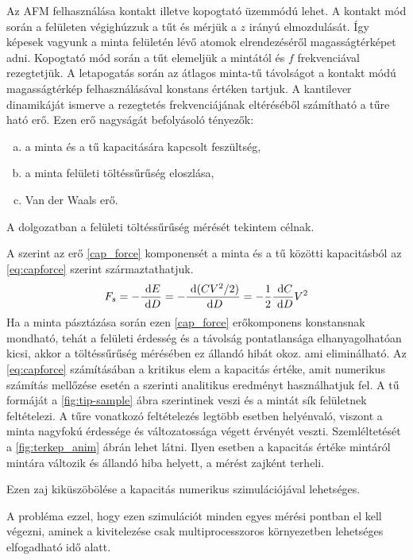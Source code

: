 	Az AFM felhasználása kontakt illetve kopogtató üzemmódú lehet. A kontakt mód során a
	felületen végighúzzuk a tűt és mérjük a $z$ irányú elmozdulását. Így képesek vagyunk a minta
	felületén lévő atomok elrendezéséről magasságtérképet adni.
	Kopogtató mód \cite{Martin1987} során a tűt elemeljük a mintától és $f$ frekvenciával rezegtetjük.
	A letapogatás során az  átlagos minta-tű távolságot a kontakt módú magasságtérkép felhasználásával
	konstans értéken tartjuk.
	A kantilever dinamikáját ismerve a rezegtetés frekvenciájának eltéréséből
	számítható a tűre ható erő. Ezen erő nagyságát befolyásoló tényezők:
	\begin{enumerate}[a)]
		\item a minta és a tű kapacitására kapcsolt feszültség,\label{cap_force}
		\item a minta felületi töltéssűrűség eloszlása,\label{sc_force}
		\item Van der Waals erő.\label{vdw_force}
	\end{enumerate}
	A dolgozatban a felületi töltéssűrűség mérését tekintem célnak.
	
	A \cite{Butt1991Dec, Butt20051} szerint az erő \ref{cap_force} komponensét a minta és a tű közötti
	kapacitásból az \eqref{eq:capforce} szerint származtathatjuk.
	\begin{equation}\label{eq:capforce} 
	F_{s} = -\frac{\ \mathrm{d} E}{\ \mathrm{d} D} = -\frac{\ \mathrm{d} (CV^2 /2)}{\ \mathrm{d} D} = -\frac12 \frac{\ \mathrm{d} C}{\ \mathrm{d} D} V^2   
	\end{equation}
	Ha a minta pásztázása során ezen \ref{cap_force} erőkomponens konstansnak mondható, tehát a felületi
	érdesség és a távolság pontatlansága elhanyagolhatóan kicsi, akkor a töltéssűrűség mérésében ez állandó hibát okoz. ami
	eliminálható.
	Az \eqref{eq:capforce} számításában a kritikus elem a kapacitás értéke, amit numerikus számítás
	mellőzése esetén a \cite{Hudlet1998} szerinti analitikus eredményt használhatjuk fel.
	A tű formáját a \ref{fig:tip-sample} ábra szerintinek veszi és a mintát sík felületnek feltételezi.
	A tűre vonatkozó feltételezés legtöbb esetben helyénvaló, viszont a minta nagyfokú érdessége és változatossága végett érvényét
	veszti. Szemléltetését a \ref{fig:terkep_anim} ábrán lehet látni. 
	Ilyen esetben a kapacitás értéke mintáról mintára változik és állandó hiba helyett, a mérést zajként terheli.
	\begin{center}
		Ezen zaj kiküszöbölése a kapacitás numerikus szimulációjával lehetséges.
	\end{center}
	A probléma ezzel, hogy ezen szimulációt minden egyes mérési pontban el kell végezni, aminek a kivitelezése
	csak multiprocesszoros környezetben lehetséges elfogadható idő alatt.
	
